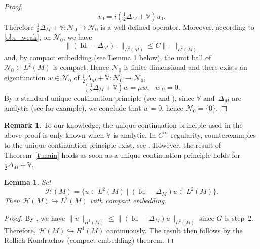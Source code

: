 \documentclass[JEP,XML,SOM,Unicode,published]{cedram}
\let\mathcal\mathscr
\let\sep\mid
\DeclareMathOperator{\Id}{Id}
\theoremstyle{plain}
\newtheorem{lemma}[theorem]{Lemma}
\theoremstyle{definition}
\newtheorem{remark}[theorem]{Remark}
\def\bbV{{\mathbb V}}
\begin{document}
\begin{proof}
\begin{equation*}
v_0=i(\tfrac{1}{2}\Delta_M+\bbV) u_0.
\end{equation*}
Therefore $\frac{1}{2}\Delta_M+\bbV:\mathcal{N}_0\to \mathcal{N}_0$ is a well-defined operator. Moreover, according to \eqref{obs_weak}, on $\mathcal{N}_0$, we have
\begin{equation*}
\|(\Id-\Delta_M)\cdot\|_{L^2(M)}\leq C\|\cdot\|_{L^2(M)}
\end{equation*}
and, by compact embedding (see Lemma \ref{l:compact} below), the unit ball of $\mathcal{N}_0\subset L^2(M)$ is compact. Hence $\mathcal{N}_0$ is finite dimensional and there exists an eigenfunction $w\in\mathcal{N}_0$ of $\tfrac12\Delta_M+\bbV:\mathcal{N}_0\to \mathcal{N}_0$, \ie \begin{equation*}
(\tfrac12\Delta_M+\bbV)w=\mu w, \ \ \ w_{|U}=0.
\end{equation*}
By a standard unique continuation principle (see \cite{Bon69} and \cite[Th.\,1.12]{Laur}), since $\bbV$ and~$\Delta_M$ are analytic (see \cite[\S 5.10]{BLU} for example), we conclude that $w=0$, hence $\mathcal{N}_0=\{0\}$.
\end{proof}
\begin{remark}\label{rem:analyticity}
To our knowledge, the unique continuation principle used in the above proof is only known when $\bbV$ is analytic. In $C^\infty$ regularity, counterexamples to the unique continuation principle exist, see \cite{Ba}. However, the result of Theorem~\ref{t:main} holds as soon as a unique continuation principle holds for~$\frac12\Delta_M+\bbV$.
\end{remark}

\begin{lemma} \label{l:compact}
Set
\begin{equation*}
\mathcal{H}(M)=\{u\in L^2(M) \sep (\Id-\Delta_M)u \in L^2(M)\}.
\end{equation*}
Then $\mathcal{H}(M)\hookrightarrow L^2(M)$ with compact embedding.
\end{lemma}
\begin{proof}
By \cite[Cor.\,B.1]{Laur}, we have $\|u\|_{H^1(M)}\leq \|(\Id-\Delta_M)u\|_{L^2(M)}$ since $G$ is step~2. Therefore, $\mathcal{H}(M)\hookrightarrow H^1(M)$ continuously. The result then follows by the Rellich-Kondrachov (compact embedding) theorem.
\end{proof}
\end{document}
